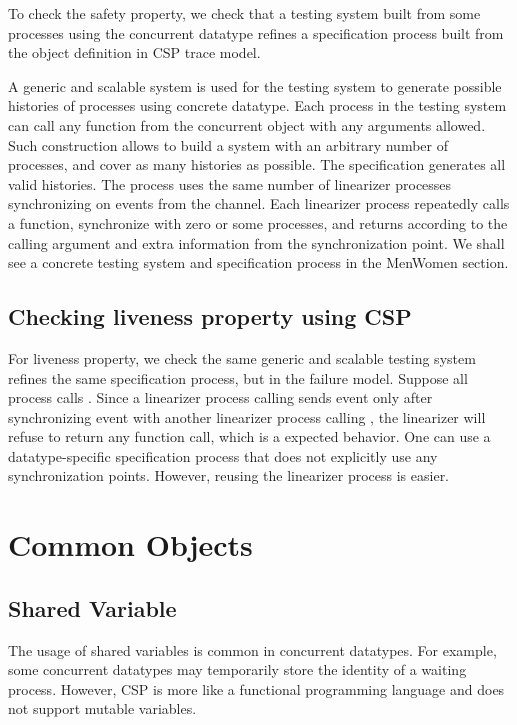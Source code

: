 \documentclass{article}
\begin{document}
To check the safety property, we check that a testing system built from some processes using the concurrent datatype refines a specification process built from the object definition in CSP trace model.

A generic and scalable system is used for the testing system to generate possible histories of processes using concrete datatype. Each process in the testing system can call any function from the concurrent object with any arguments allowed. Such construction allows to build a system with an arbitrary number of processes, and cover as many histories as possible. 
The specification generates all valid histories. The process uses the same number of linearizer processes synchronizing on events from the  channel. Each linearizer process repeatedly calls a function, synchronize with zero or some processes, and returns according to the calling argument and extra information from the synchronization point. 
We shall see a concrete testing system and specification process in the MenWomen section. 

\subsection{Checking liveness property using CSP}
For liveness property, we check the same generic and scalable testing system refines the same specification process, but in the failure model. Suppose all process calls . Since a linearizer process calling  sends  event only after synchronizing  event with another linearizer process calling , the linearizer will refuse to return any function call, which is a expected behavior. One can use a datatype-specific specification process that does not explicitly use any synchronization points. However, reusing the linearizer process is easier. 

\section{Common Objects}
\subsection{Shared Variable}
The usage of shared variables is common in concurrent datatypes. For example, some concurrent datatypes may temporarily store the identity of a waiting process. However, CSP is more like a functional programming language and does not support mutable variables. 
\end{document}
